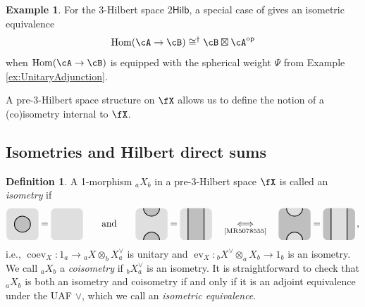 \documentclass[12pt, reqno]{amsart}
\newcommand{\tikzmath}[2][]
{\vcenter{\hbox{\begin{tikzpicture}[#1]#2\end{tikzpicture}}}
}
\DeclareMathOperator{\coev}{coev}
\DeclareMathOperator{\ev}{ev}
\DeclareMathOperator{\Hom}{Hom}
\newcommand{\op}{\mathrm{op}}
\newcommand{\Hilb}{\mathsf{Hilb}}
\theoremstyle{plain}
\theoremstyle{definition}
\newtheorem{defn}[thm]{Definition}
\newtheorem{ex}[thm]{Example}
\begin{document}
\begin{ex}
\label{ex:HomIsTensor}
For the 3-Hilbert space $2\Hilb$, a special case of \cite[Prop.~3.14]{MR5078555} gives an isometric equivalence
$$
\Hom(\cA\to \cB) \cong^\dag \cB\boxtimes \cA^{\op}
$$
when $\Hom(\cA\to \cB)$ is equipped with the spherical weight $\Psi$ from Example \ref{ex:UnitaryAdjunction}.
\end{ex}

A pre-3-Hilbert space structure on $\fX$ allows us to define the notion of a (co)isometry internal to $\fX$.


\subsection{Isometries and Hilbert direct sums}

\begin{defn}
A 1-morphism ${}_aX_b$ in a pre-3-Hilbert space $\fX$ is called an \emph{isometry} if 
$$
\tikzmath{
\fill[lightgray!50,rounded corners=5pt]
(-.6,-.6) rectangle (.6,.6);
\draw[fill=lightgray, thick] (0,0) circle (.3);
}
=
\tikzmath{
\fill[lightgray!50,rounded corners=5pt]
(-.6,-.6) rectangle (.6,.6);
}
\qquad\text{and}\qquad
\tikzmath{
\fill[lightgray!50,rounded corners=5pt]
(-.6,-.6) rectangle (.6,.6);
\draw[fill=lightgray, thick] (-.3,-.6) arc(180:0:.3cm);
\draw[fill=lightgray, thick] (-.3,.6) arc(-180:0:.3cm);
}
=
\tikzmath{
\fill[lightgray!50,rounded corners=5pt]
(-.6,-.6) rectangle (.6,.6);
\fill[lightgray] (-.3,-.6) rectangle (.3,.6);
\draw[thick] (-.3,-.6) -- (-.3,.6);
\draw[thick] (.3,-.6) -- (.3,.6);
}
\quad\underset{\text{\cite[Rem.~4.12]{MR5078555}}}{\Longleftrightarrow}\quad
\tikzmath{
\fill[lightgray,rounded corners=5pt]
(-.6,-.6) rectangle (.6,.6);
\draw[fill=lightgray!50, thick] (-.3,-.6) arc(180:0:.3cm);
\draw[fill=lightgray!50, thick] (-.3,.6) arc(-180:0:.3cm);
}
=
\tikzmath{
\fill[lightgray,rounded corners=5pt]
(-.6,-.6) rectangle (.6,.6);
\fill[lightgray!50] (-.3,-.6) rectangle (.3,.6);
\draw[thick] (-.3,-.6) -- (-.3,.6);
\draw[thick] (.3,-.6) -- (.3,.6);
}\,,
$$
i.e., $\coev_X\colon 1_a\to {}_aX\otimes_b X^\vee_a$ is unitary and $\ev_X\colon {}_bX^\vee\otimes_a X_b\to 1_b$ is an isometry.
We call ${}_aX_b$ a \emph{coisometry} if ${}_bX^\vee_a$ is an isometry.
It is straightforward to check that ${}_aX_b$ is both an isometry and coisometry if and only if it is an adjoint equivalence under the UAF $\vee$, which we call an \emph{isometric equivalence}. 
\end{defn}
\end{document}
